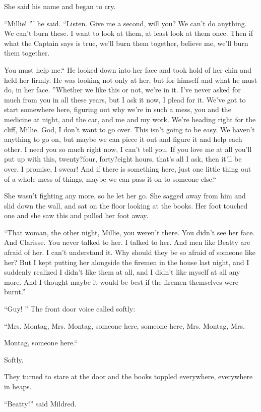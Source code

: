 \documentclass[11pt,openany]{book}
\begin{document}
She said his name and began to cry.

``Millie! ''' he said. ``Listen. Give me a second, will you? We can't do anything. We can't burn these. I want to look at them, at least look at them once. Then if what the Captain says is true, we'll burn them together, believe me, we'll burn them together.

You must help me.`` He looked down into her face and took hold of her chin and held her firmly. He was looking not only at her, but for himself and what he must do, in her face. ''Whether we like this or not, we're in it. I've never asked for much from you in all these years, but I ask it now, I plead for it. We've got to start somewhere here, figuring out why we're in such a mess, you and the medicine at night, and the car, and me and my work. We're heading right for the cliff, Millie. God, I don't want to go over. This isn't going to be easy. We haven't anything to go on, but maybe we can piece it out and figure it and help each other. I need you so much right now, I can't tell you. If you love me at all you'll put up with this, twenty?four, forty?eight hours, that's all I ask, then it'll be over. I promise, I swear! And if there is something here, just one little thing out of a whole mess of things, maybe we can pass it on to someone else.``

She wasn't fighting any more, so he let her go. She sagged away from him and slid down the wall, and sat on the floor looking at the books. Her foot touched one and she saw this and pulled her foot away.

``That woman, the other night, Millie, you weren't there. You didn't see her face. And Clarisse. You never talked to her. I talked to her. And men like Beatty are afraid of her. I can't understand it. Why should they be so afraid of someone like her? But I kept putting her alongside the firemen in the house last night, and I suddenly realized I didn't like them at all, and I didn't like myself at all any more. And I thought maybe it would be best if the firemen themselves were burnt.''

``Guy! '' The front door voice called softly:

``Mrs. Montag, Mrs. Montag, someone here, someone here, Mrs. Montag, Mrs.

Montag, someone here.``

Softly.

They turned to stare at the door and the books toppled everywhere, everywhere in heaps.

``Beatty!'' said Mildred.
\end{document}
